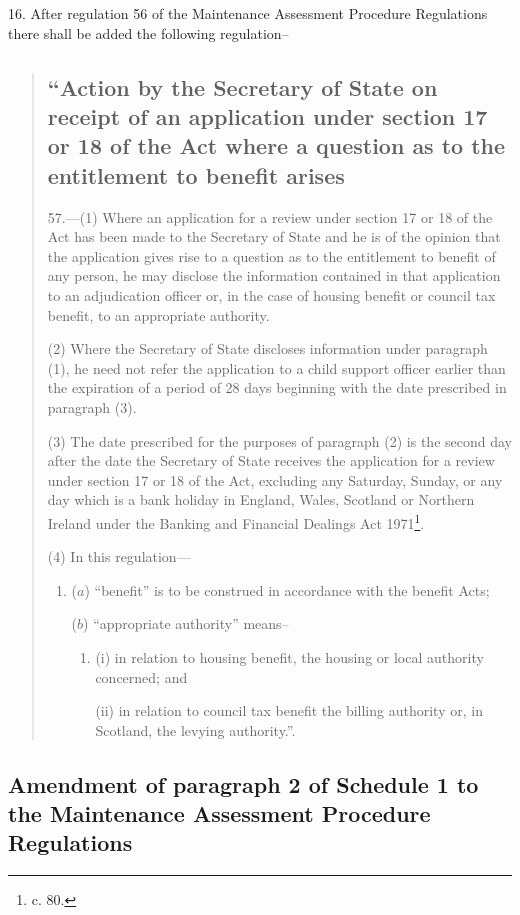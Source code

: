 \documentclass[a4paper]{article}
\begin{document}
16.  After regulation 56 of the Maintenance Assessment Procedure Regulations there shall be added the following regulation–
\begin{quotation}
\subsection*{“Action by the Secretary of State on receipt of an application under section 17 or 18 of the Act where a question as to the entitlement to benefit arises}

57.—(1) Where an application for a review under section 17 or 18 of the Act has been made to the Secretary of State and he is of the opinion that the application gives rise to a question as to the entitlement to benefit of any person, he may disclose the information contained in that application to an adjudication officer or, in the case of housing benefit or council tax benefit, to an appropriate authority.

(2) Where the Secretary of State discloses information under paragraph (1), he need not refer the application to a child support officer earlier than the expiration of a period of 28 days beginning with the date prescribed in paragraph (3).

(3) The date prescribed for the purposes of paragraph (2) is the second day after the date the Secretary of State receives the application for a review under section 17 or 18 of the Act, excluding any Saturday, Sunday, or any day which is a bank holiday in England, Wales, Scotland or Northern Ireland under the Banking and Financial Dealings Act 1971\footnote{ c. 80.}.

(4) In this regulation---
\begin{enumerate}\item[]
($a$) “benefit” is to be construed in accordance with the benefit Acts;

($b$) “appropriate authority” means–
\begin{enumerate}\item[]
(i) in relation to housing benefit, the housing or local authority concerned; and

(ii) in relation to council tax benefit the billing authority or, in Scotland, the levying authority.”.
\end{enumerate}
\end{enumerate}
\end{quotation}

\subsection[17. Amendment of paragraph 2 of Schedule 1 to the Maintenance Assessment Procedure Regulations]{Amendment of paragraph 2 of Schedule 1 to the Maintenance Assessment Procedure Regulations}
\end{document}
